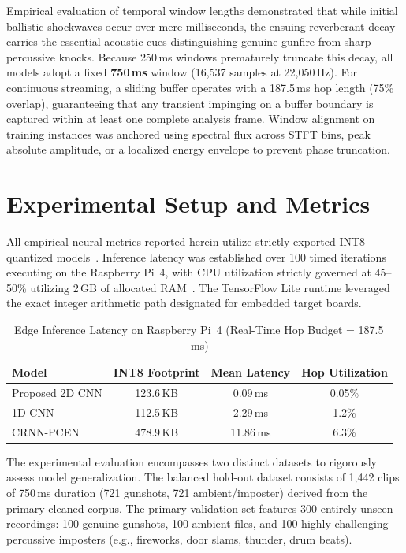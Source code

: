\documentclass[conference]{IEEEtran}
\begin{document}
Empirical evaluation of temporal window lengths demonstrated that while initial ballistic shockwaves occur over mere milliseconds, the ensuing reverberant decay carries the essential acoustic cues distinguishing genuine gunfire from sharp percussive knocks. Because 250\,ms windows prematurely truncate this decay, all models adopt a fixed \textbf{750\,ms} window (16{,}537 samples at 22{,}050\,Hz). For continuous streaming, a sliding buffer operates with a 187.5\,ms hop length (75\% overlap), guaranteeing that any transient impinging on a buffer boundary is captured within at least one complete analysis frame. Window alignment on training instances was anchored using spectral flux across STFT bins, peak absolute amplitude, or a localized energy envelope to prevent phase truncation.

\section{Experimental Setup and Metrics}
\label{sec:setup}

All empirical neural metrics reported herein utilize strictly exported INT8 quantized models~\cite{david2021}. Inference latency was established over 100 timed iterations executing on the Raspberry Pi~4, with CPU utilization strictly governed at 45--50\% utilizing 2\,GB of allocated RAM~\cite{banbury2021}. The TensorFlow Lite runtime leveraged the exact integer arithmetic path designated for embedded target boards.

\begin{table}[!b]
\centering
\caption{Edge Inference Latency on Raspberry Pi~4 (Real-Time Hop Budget = 187.5\,ms)}
\label{tab:latency}
\footnotesize
\begin{tabular}{lccc}
\toprule
\textbf{Model} & \textbf{INT8 Footprint} & \textbf{Mean Latency} & \textbf{Hop Utilization} \\
\midrule
Proposed 2D CNN & 123.6\,KB & 0.09\,ms & 0.05\% \\
1D CNN & 112.5\,KB & 2.29\,ms & 1.2\% \\
CRNN-PCEN & 478.9\,KB & 11.86\,ms & 6.3\% \\
\bottomrule
\end{tabular}
\end{table}

The experimental evaluation encompasses two distinct datasets to rigorously assess model generalization. The balanced hold-out dataset consists of 1,442 clips of 750\,ms duration (721 gunshots, 721 ambient/imposter) derived from the primary cleaned corpus. The primary validation set features 300 entirely unseen recordings: 100 genuine gunshots, 100 ambient files, and 100 highly challenging percussive imposters (e.g., fireworks, door slams, thunder, drum beats).
\end{document}
